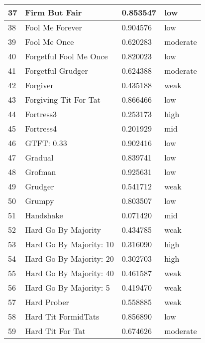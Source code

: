 \begin{longtable}{|p{0.5cm}||p{6cm}||p{4cm}||p{2cm}|}
			37  & Firm But Fair               & 0.853547          & low      \\ \hline
			38  & Fool Me Forever             & 0.904576          & low      \\ \hline
			39  & Fool Me Once                & 0.620283          & moderate \\ \hline
			40  & Forgetful Fool Me Once      & 0.820023          & low      \\ \hline
			41  & Forgetful Grudger           & 0.624388          & moderate \\ \hline
			42  & Forgiver                    & 0.435188          & weak     \\ \hline
			43  & Forgiving Tit For Tat       & 0.866466          & low      \\ \hline
			44  & Fortress3                   & 0.253173          & high     \\ \hline
			45  & Fortress4                   & 0.201929          & mid      \\ \hline
			46  & GTFT: 0.33                  & 0.902416          & low      \\ \hline
			47  & Gradual                     & 0.839741          & low      \\ \hline
			48  & Grofman                     & 0.925631          & low      \\ \hline
			49  & Grudger                     & 0.541712          & weak     \\ \hline
			50  & Grumpy                      & 0.803507          & low      \\ \hline
			51  & Handshake                   & 0.071420          & mid      \\ \hline
			52  & Hard Go By Majority         & 0.434785          & weak     \\ \hline
			53  & Hard Go By Majority: 10     & 0.316090          & high     \\ \hline
			54  & Hard Go By Majority: 20     & 0.302703          & high     \\ \hline
			55  & Hard Go By Majority: 40     & 0.461587          & weak     \\ \hline
			56  & Hard Go By Majority: 5      & 0.419470          & weak     \\ \hline
			57  & Hard Prober                 & 0.558885          & weak     \\ \hline
			58  & Hard Tit FormidTats         & 0.856890          & low      \\ \hline
			59  & Hard Tit For Tat            & 0.674626          & moderate \\ \hline

\end{longtable}
